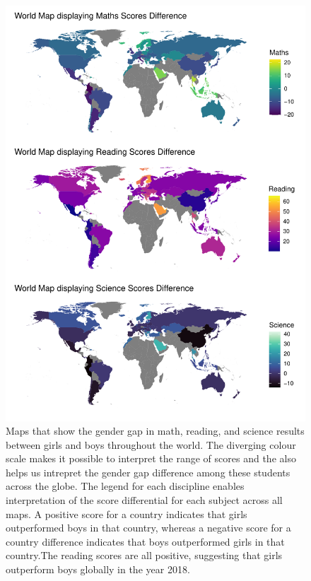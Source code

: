 \begin{Schunk}
\begin{figure}[H]
\includegraphics[width=1\linewidth]{learningtower_files/figure-latex/ggplot-maps-1} \caption[Maps that show the gender gap in math, reading, and science results between girls and boys throughout the world]{Maps that show the gender gap in math, reading, and science results between girls and boys throughout the world. The diverging colour scale makes it possible to interpret the range of scores and the also helps us intrepret the gender gap difference among these students across the globe. The legend for each discipline enables interpretation of the score differential for each subject across all maps. A positive score for a country indicates that girls outperformed boys in that country, whereas a negative score for a country difference indicates that boys outperformed girls in that country.The reading scores are all positive, suggesting that girls outperform boys globally in the year 2018.}\label{fig:ggplot-maps}
\end{figure}
\end{Schunk}

